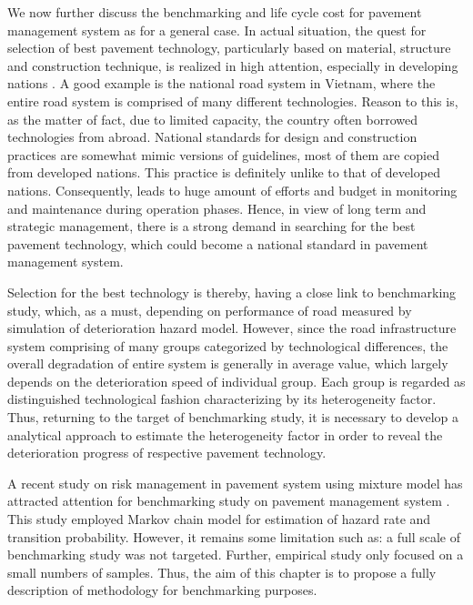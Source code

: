 We now further discuss the benchmarking and life cycle cost for pavement management system as for a general case. In actual situation, the quest for selection of best pavement technology, particularly based on material, structure and construction technique, is realized in high attention, especially in developing nations \cite{kcleong}. A good example is the national road system in Vietnam, where the entire road system is comprised of many different technologies. Reason to this is, as the matter of fact, due to limited capacity, the country often borrowed technologies from abroad. National standards for design and construction practices are somewhat mimic versions of guidelines, most of them are copied from developed nations. This practice is definitely unlike to that of developed nations. Consequently, leads to huge amount of efforts and budget in monitoring and maintenance during operation phases. Hence, in view of long term and strategic management, there is a strong demand in searching for the best pavement technology, which could become a national standard in pavement management system.

Selection for the best technology is thereby, having a close link to benchmarking study, which, as a must, depending on performance of road measured by simulation of deterioration hazard model. However, since the road infrastructure system comprising of many groups categorized by technological differences, the overall degradation of entire system is generally in average value, which largely depends on the deterioration speed of individual group. Each group is regarded as distinguished technological fashion characterizing by its heterogeneity factor. Thus, returning to the target of benchmarking study, it is necessary to develop a analytical approach to estimate the heterogeneity factor in order to reveal the deterioration progress of respective pavement technology.

A recent study on risk management in pavement system using mixture model has attracted attention for benchmarking study on pavement management system \cite{namieee}. This study employed Markov chain model for estimation of hazard rate and transition probability. However, it remains some limitation such as: a full scale of benchmarking study was not targeted. Further, empirical study only focused on a small numbers of samples. Thus, the aim of this chapter is to propose a fully description of methodology for benchmarking purposes. 

